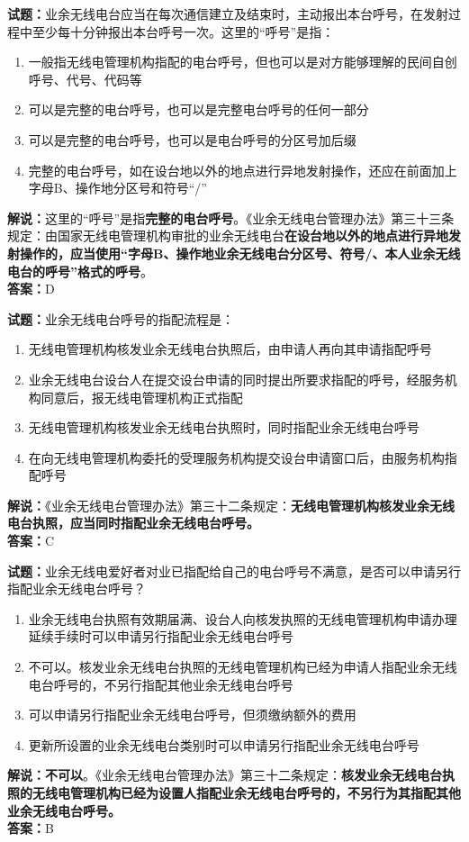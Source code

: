 \documentclass{ctexbook}
\begin{document}
\bigskip


\noindent\textbf{试题：}业余无线电台应当在每次通信建立及结束时，主动报出本台呼号，在发射过程中至少每十分钟报出本台呼号一次。这里的“呼号”是指：
\begin{enumerate}[leftmargin=3em]
\item 一般指无线电管理机构指配的电台呼号，但也可以是对方能够理解的民间自创呼号、代号、代码等
\item 可以是完整的电台呼号，也可以是完整电台呼号的任何一部分
\item 可以是完整的电台呼号，也可以是电台呼号的分区号加后缀
\item 完整的电台呼号，如在设台地以外的地点进行异地发射操作，还应在前面加上字母B、操作地分区号和符号“/”
\end{enumerate}
\noindent\textbf{解说：}这里的“呼号”是指\textbf{完整的电台呼号}。《业余无线电台管理办法》第三十三条规定：由国家无线电管理机构审批的业余无线电台\textbf{在设台地以外的地点进行异地发射操作的，应当使用“字母B、操作地业余无线电台分区号、符号/、本人业余无线电台的呼号”格式的呼号}。\\\noindent\textbf{答案：}D



\bigskip


\noindent\textbf{试题：}业余无线电台呼号的指配流程是：
\begin{enumerate}[leftmargin=3em]
\item 无线电管理机构核发业余无线电台执照后，由申请人再向其申请指配呼号
\item 业余无线电台设台人在提交设台申请的同时提出所要求指配的呼号，经服务机构同意后，报无线电管理机构正式指配
\item 无线电管理机构核发业余无线电台执照时，同时指配业余无线电台呼号
\item 在向无线电管理机构委托的受理服务机构提交设台申请窗口后，由服务机构指配呼号
\end{enumerate}
\noindent\textbf{解说：}《业余无线电台管理办法》第三十二条规定：\textbf{无线电管理机构核发业余无线电台执照，应当同时指配业余无线电台呼号。}\\\noindent\textbf{答案：}C



\bigskip


\noindent\textbf{试题：}业余无线电爱好者对业已指配给自己的电台呼号不满意，是否可以申请另行指配业余无线电台呼号？
\begin{enumerate}[leftmargin=3em]
\item 业余无线电台执照有效期届满、设台人向核发执照的无线电管理机构申请办理延续手续时可以申请另行指配业余无线电台呼号
\item 不可以。核发业余无线电台执照的无线电管理机构已经为申请人指配业余无线电台呼号的，不另行指配其他业余无线电台呼号
\item 可以申请另行指配业余无线电台呼号，但须缴纳额外的费用
\item 更新所设置的业余无线电台类别时可以申请另行指配业余无线电台呼号
\end{enumerate}
\textbf{解说：不可以}。《业余无线电台管理办法》第三十二条规定：\textbf{核发业余无线电台执照的无线电管理机构已经为设置人指配业余无线电台呼号的，不另行为其指配其他业余无线电台呼号。}\\\noindent\textbf{答案：}B
\end{document}
